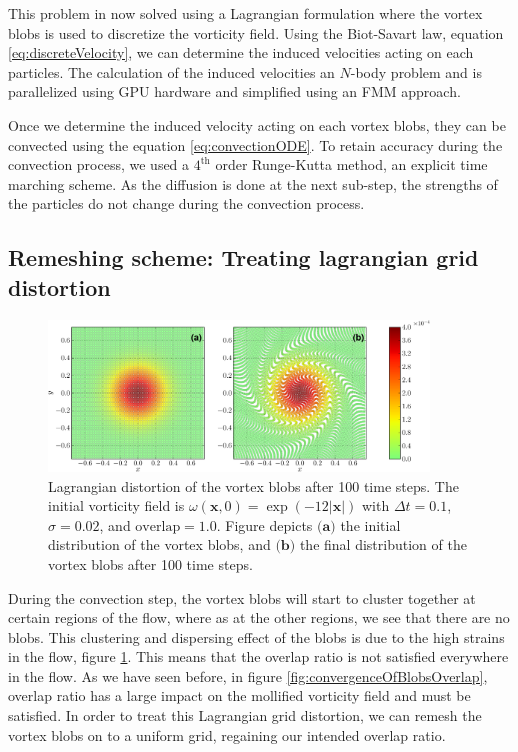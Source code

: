 This problem in now solved using a Lagrangian formulation where the vortex blobs is used to discretize the vorticity field. Using the Biot-Savart law, equation \ref{eq:discreteVelocity}, we can determine the induced velocities acting on each particles. The calculation of the induced velocities an $N$-body problem and is parallelized using GPU hardware and simplified using an FMM approach.

Once we determine the induced velocity acting on each vortex blobs, they can be convected using the equation \ref{eq:convectionODE}. To retain accuracy during the convection process, we used a $4^{\mathrm{th}}$ order Runge-Kutta method, an explicit time marching scheme. As the diffusion is done at the next sub-step, the strengths of the particles do not change during the convection process.

\subsection{Remeshing scheme: Treating lagrangian grid distortion}
\label{subsec:remeshing}

	\begin{figure}[t]
	\centering
	\includegraphics[width=0.9\textwidth]{figures/lagrangian/distortion-crop.pdf}
    \caption{Lagrangian distortion of the vortex blobs after 100 time steps. The initial vorticity field is $\omega\left(\mathbf{x},0\right) = \exp\left(-12\left|\mathbf{x}\right|\right)$ with $\Delta t = 0.1$, $\sigma=0.02$, and $\mathrm{overlap} = 1.0$. Figure depicts $\textbf{(a)}$ the initial distribution of the vortex blobs, and $\textbf{(b)}$ the final distribution of the vortex blobs after 100 time steps.}
    \label{fig:distortion}
	\end{figure}

During the convection step, the vortex blobs will start to cluster together at certain regions of the flow, where as at the other regions, we see that there are no blobs. This clustering and dispersing effect of the blobs is due to the high strains in the flow, figure \ref{fig:distortion}. This means that the overlap ratio is not satisfied everywhere in the flow. As we have seen before, in figure \ref{fig:convergenceOfBlobsOverlap}, overlap ratio has a large impact on the mollified vorticity field and must be satisfied. In order to treat this Lagrangian grid distortion, we can remesh the vortex blobs on to a uniform grid, regaining our intended overlap ratio.

